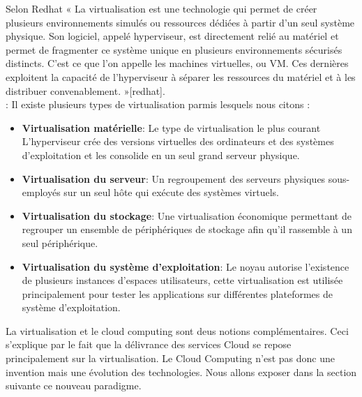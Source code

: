 Selon Redhat « La virtualisation est une technologie qui permet de créer plusieurs environnements simulés ou ressources dédiées à partir d'un seul système physique. Son logiciel, appelé hyperviseur, est directement relié au matériel et permet de fragmenter ce système unique en plusieurs environnements sécurisés distincts. C'est ce que l'on appelle les machines virtuelles, ou VM. Ces dernières exploitent la capacité de l'hyperviseur à séparer les ressources du matériel et à les distribuer convenablement. »[redhat]. \\
:  Il existe plusieurs  types de virtualisation parmis lesquels nous citons :
\begin{itemize}
	\item \textbf{Virtualisation matérielle}: Le type de virtualisation le plus courant L'hyperviseur crée des versions virtuelles des ordinateurs et des systèmes d'exploitation et les consolide en un seul grand serveur physique.
	\item \textbf{Virtualisation du serveur}:  Un regroupement des serveurs physiques sous-employés sur un seul hôte  qui exécute des systèmes virtuels.
	\item \textbf{Virtualisation du stockage}: Une virtualisation économique permettant de regrouper un ensemble  de périphériques de stockage afin qu'il rassemble à un seul périphérique.
	\item \textbf{Virtualisation du système d'exploitation}: Le noyau autorise l'existence de plusieurs instances d'espaces utilisateurs, cette virtualisation est utilisée principalement pour tester les applications sur différentes plateformes de système d'exploitation.
\end{itemize}
La virtualisation et le cloud computing sont deus notions complémentaires. Ceci s'explique par le fait que la délivrance des services Cloud se repose principalement sur la virtualisation.  Le Cloud Computing n'est pas donc une invention mais une évolution des technologies. Nous allons exposer dans la section suivante ce nouveau paradigme.
